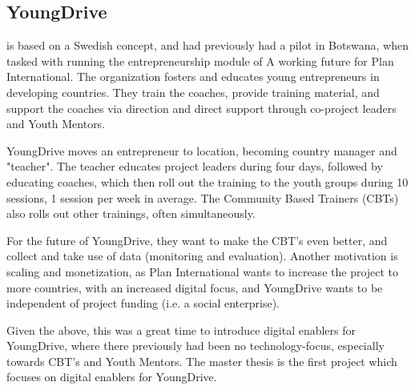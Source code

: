     \subsection{YoungDrive}

    \cite{youngdrive-web} is based on a Swedish concept, and had previously had a pilot in Botswana, when tasked with running the entrepreneurship module of A working future for Plan International. The organization fosters and educates young entrepreneurs in developing countries. They train the coaches, provide training material, and support the coaches via direction and direct support through co-project leaders and Youth Mentors.

    YoungDrive moves an entrepreneur to location, becoming country manager and "teacher". The teacher educates project leaders during four days, followed by educating coaches, which then roll out the training to the youth groups during 10 sessions, 1 session per week in average. The Community Based Trainers (CBTs) also rolls out other trainings, often simultaneously.

    For the future of YoungDrive, they want to make the CBT's even better, and collect and take use of data (monitoring and evaluation). Another motivation is scaling and monetization, as Plan International wants to increase the project to more countries, with an increased digital focus, and YoungDrive wants to be independent of project funding (i.e. a social enterprise).

    Given the above, this was a great time to introduce digital enablers for YoungDrive, where there previously had been no technology-focus, especially towards CBT's and Youth Mentors. The master thesis is the first project which focuses on digital enablers for YoungDrive.
